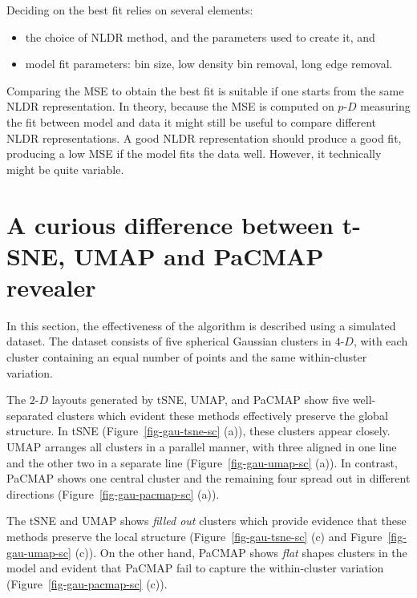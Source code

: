 \documentclass[
  12pt]{article}
\providecommand{\tightlist}{%
  \setlength{\itemsep}{0pt}\setlength{\parskip}{0pt}}\usepackage{longtable,booktabs,array}
\def\tightlist{}
\newcommand\pD{$p\text{-}D$}
\newcommand\gD{$2\text{-}D$}
\begin{document}
Deciding on the best fit relies on several elements:

\begin{itemize}
\tightlist
\item
  the choice of NLDR method, and the parameters used to create it, and
\item
  model fit parameters: bin size, low density bin removal, long edge
  removal.
\end{itemize}

Comparing the MSE to obtain the best fit is suitable if one starts from
the same NLDR representation. In theory, because the MSE is computed on
\pD{} measuring the fit between model and data it might still be useful
to compare different NLDR representations. A good NLDR representation
should produce a good fit, producing a low MSE if the model fits the
data well. However, it technically might be quite variable.

\section{A curious difference between t-SNE, UMAP and PaCMAP
revealer}\label{a-curious-difference-between-t-sne-umap-and-pacmap-revealer}

In this section, the effectiveness of the algorithm is described using a
simulated dataset. The dataset consists of five spherical Gaussian
clusters in \(4\text{-}D\), with each cluster containing an equal number
of points and the same within-cluster variation.

The \gD{} layouts generated by tSNE, UMAP, and PaCMAP show five
well-separated clusters which evident these methods effectively preserve
the global structure. In tSNE (Figure~\ref{fig-gau-tsne-sc} (a)), these
clusters appear closely. UMAP arranges all clusters in a parallel
manner, with three aligned in one line and the other two in a separate
line (Figure~\ref{fig-gau-umap-sc} (a)). In contrast, PaCMAP shows one
central cluster and the remaining four spread out in different
directions (Figure~\ref{fig-gau-pacmap-sc} (a)).

The tSNE and UMAP shows \emph{filled out} clusters which provide
evidence that these methods preserve the local structure
(Figure~\ref{fig-gau-tsne-sc} (c) and Figure~\ref{fig-gau-umap-sc} (c)).
On the other hand, PaCMAP shows \emph{flat} shapes clusters in the model
and evident that PaCMAP fail to capture the within-cluster variation
(Figure~\ref{fig-gau-pacmap-sc} (c)).
\end{document}
